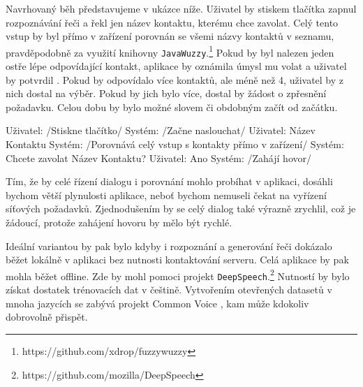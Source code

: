 Navrhovaný běh představujeme v ukázce níže. Uživatel by stiskem
tlačítka zapnul rozpoznávání řeči a řekl jen název kontaktu,
kterému chce zavolat. Celý tento vstup by byl přímo v zařízení
porovnán se všemi názvy kontaktů v seznamu, pravděpodobně za
využití knihovny \texttt{JavaWuzzy}.\footnote{https://github.com/xdrop/fuzzywuzzy} Pokud by byl
nalezen jeden ostře lépe odpovídající kontakt, aplikace
by oznámila úmysl mu volat a uživatel by potvrdil .
Pokud by odpovídalo více kontaktů, ale méně než 4, uživatel
by z nich dostal na výběr. Pokud by jich bylo více, dostal by
žádost o zpřesnění požadavku. Celou dobu by bylo možné slovem
 či obdobným začít od začátku.
\begin{code}
    Uživatel: /Stiskne tlačítko/
    Systém:   /Začne naslouchat/
    Uživatel: Název Kontaktu
    Systém:   /Porovnává celý vstup s kontakty přímo v zařízení/
    Systém:   Chcete zavolat Název Kontaktu?
    Uživatel: Ano
    Systém:   /Zahájí hovor/
\end{code}

Tím, že by celé řízení dialogu i porovnání mohlo probíhat v aplikaci,
dosáhli bychom větší plynulosti aplikace, neboť bychom nemuseli čekat
na vyřízení síťových požadavků. Zjednodušením by se celý dialog také
výrazně zrychlil, což je žádoucí, protože zahájení hovoru by mělo
být rychlé.

Ideální variantou by pak bylo kdyby i rozpoznání a generování řeči
dokázalo běžet lokálně v aplikaci bez nutnosti kontaktování serveru.
Celá aplikace by pak mohla běžet offline. Zde by mohl pomoci projekt
\texttt{DeepSpeech}.\footnote{https://github.com/mozilla/DeepSpeech}
Nutností by bylo získat dostatek trénovacích dat v češtině. Vytvořením
otevřených datasetů v mnoha jazycích se zabývá projekt Common Voice \citep{commonvoice_2020},
kam může kdokoliv dobrovolně přispět.